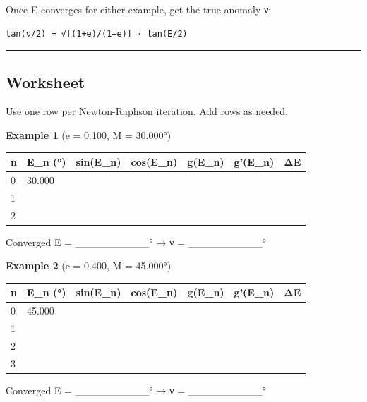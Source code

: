 \documentclass[
  10pt,
]{article}
\begin{document}
Once E converges for either example, get the true anomaly ν:

\begin{verbatim}
tan(ν/2) = √[(1+e)/(1−e)] · tan(E/2)
\end{verbatim}

\begin{center}\rule{0.5\linewidth}{0.5pt}\end{center}

\hypertarget{worksheet}{%
\subsection{Worksheet}\label{worksheet}}

Use one row per Newton-Raphson iteration. Add rows as needed.

\textbf{Example 1} (e = 0.100, M = 30.000°)

\begin{longtable}[]{@{}lllllll@{}}
\toprule
n & E\_n (°) & sin(E\_n) & cos(E\_n) & g(E\_n) & g'(E\_n) &
ΔE\tabularnewline
\midrule
\endhead
0 & 30.000 & & & & &\tabularnewline
1 & & & & & &\tabularnewline
2 & & & & & &\tabularnewline
\bottomrule
\end{longtable}

Converged E = \_\_\_\_\_\_\_\_\_\_° → ν = \_\_\_\_\_\_\_\_\_\_°

\textbf{Example 2} (e = 0.400, M = 45.000°)

\begin{longtable}[]{@{}lllllll@{}}
\toprule
n & E\_n (°) & sin(E\_n) & cos(E\_n) & g(E\_n) & g'(E\_n) &
ΔE\tabularnewline
\midrule
\endhead
0 & 45.000 & & & & &\tabularnewline
1 & & & & & &\tabularnewline
2 & & & & & &\tabularnewline
3 & & & & & &\tabularnewline
\bottomrule
\end{longtable}

Converged E = \_\_\_\_\_\_\_\_\_\_° → ν = \_\_\_\_\_\_\_\_\_\_°
\end{document}
